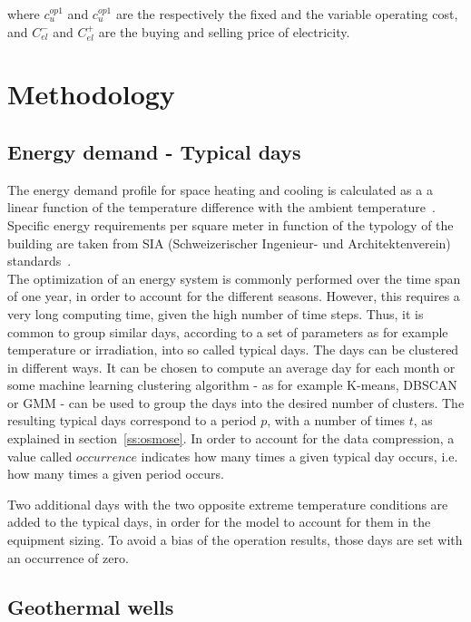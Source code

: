 \documentclass{article}
\begin{document}
where $c_{u}^{op1}$ and $c_{u}^{op1}$ are the respectively the fixed and the variable operating cost, and $C_{el}^{-}$ and $C_{el}^{+}$ are the buying and selling price of electricity.

\newpage
\section{Methodology}

\subsection{Energy demand - Typical days}\label{ss:typicalDays}
The energy demand profile for space heating and cooling is calculated as a a linear function of the temperature difference with the ambient temperature~\cite{girardinEnerGisGeographicalInformation2010}. Specific energy requirements per square meter in function of the typology of the building are taken from SIA (Schweizerischer Ingenieur- und Architektenverein) standards~\cite{siaSIA38020162016}.\\

The optimization of an energy system is commonly performed over the time span of one year, in order to account for the different seasons. However, this requires a very long computing time, given the high number of time steps. Thus, it is common to group similar days, according to a set of parameters as for example temperature or irradiation, into so called typical days. The days can be clustered in different ways. It can be chosen to compute an average day for each month or some machine learning clustering algorithm - as for example K-means, DBSCAN or GMM - can be used to group the days into the desired number of clusters.
The resulting typical days correspond to a period $p$, with a number of times $t$, as explained in section~\ref{ss:osmose}. In order to account for the data compression, a value called $occurrence$ indicates how many times a given typical day occurs, i.e. how many times a given period occurs.

Two additional days with the two opposite extreme temperature conditions are added to the typical days, in order for the model to account for them in the equipment sizing. To avoid a bias of the operation results, those days are set with an occurrence of zero.


\subsection{Geothermal wells}\label{ss:gtw}
\end{document}
